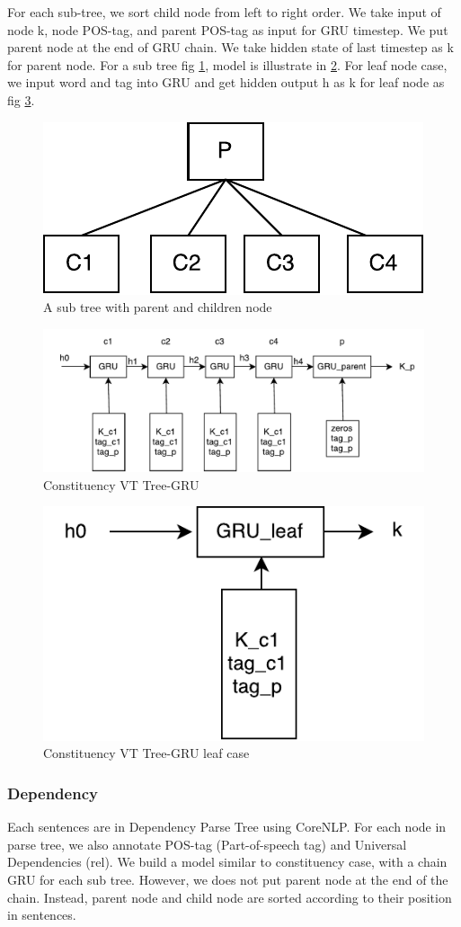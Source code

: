 For each sub-tree, we sort child node from left to right order. We take input of node k, node POS-tag, and parent POS-tag as input for GRU timestep. We put parent node at the end of GRU chain. We take hidden state of last timestep as k for parent node. For a sub tree fig \ref{fig:treecp}, model is illustrate in \ref{fig:cvtgru}. For leaf node case, we input word and tag into GRU and get hidden output h as k for leaf node as fig \ref{fig:gruleaf}.
\begin{figure}[H]
	\centering
	\includegraphics[width=0.5\linewidth]{../figure/treecp}
	\caption[A sub tree with parent and children node]{A sub tree with parent and children node}
	\label{fig:treecp}
\end{figure}

\begin{figure}[H]
	\centering
	\includegraphics[width=0.7\linewidth]{../figure/cvtgru}
	\caption[Constituency VT Tree-GRU]{Constituency VT Tree-GRU}
	\label{fig:cvtgru}
\end{figure}

\begin{figure}[H]
	\centering
	\includegraphics[width=0.4\linewidth]{../figure/gruleaf}
	\caption[Constituency VT Tree-GRU leaf case]{Constituency VT Tree-GRU leaf case}
	\label{fig:gruleaf}
\end{figure}

\subsubsection{Dependency}
Each sentences are in Dependency Parse Tree using CoreNLP. For each node in parse tree, we also annotate POS-tag (Part-of-speech tag) and Universal Dependencies (rel).
We build a model similar to constituency case, with a chain GRU for each sub tree. However, we does not put parent node at the end of the chain. Instead, parent node and child node are sorted according to their position in sentences.




